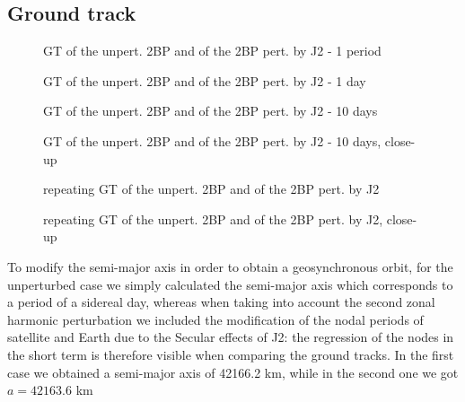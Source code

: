 \documentclass[11pt,a4paper]{report}
\begin{document}
\subsection{Ground track}
\begin{figure}[H]
\centering
{}
\caption{GT of the unpert. 2BP and of the 2BP pert. by J2 - 1 period}
\end{figure}
\begin{figure}[H]
\centering
{}
\caption{GT of the unpert. 2BP and of the 2BP pert. by J2 - 1 day}
\end{figure}
\begin{figure}[H]
\centering
{}
\caption{GT of the unpert. 2BP and of the 2BP pert. by J2 - 10 days}
\end{figure}
\begin{figure}[H]
\centering
{}
\caption{GT of the unpert. 2BP and of the 2BP pert. by J2 - 10 days, close-up}
\end{figure}
\begin{figure}[H]
\centering
{}
\caption{repeating GT of the unpert. 2BP and of the 2BP pert. by J2}
\end{figure}
\begin{figure}[H]
\centering
{}
\caption{repeating GT of the unpert. 2BP and of the 2BP pert. by J2, close-up}
\end{figure}

To modify the semi-major axis in order to obtain a geosynchronous orbit, for the unperturbed case we simply calculated the semi-major axis which corresponds to a period of a sidereal day, whereas when taking into account the second zonal harmonic perturbation we included the modification of the nodal periods of satellite and Earth due to the Secular effects of J2: the regression of the nodes in the short term is therefore visible when comparing the ground tracks.
In the first case we obtained a semi-major axis of 42166.2 km, while in the second one we got $a = 42163.6$ km
\end{document}

